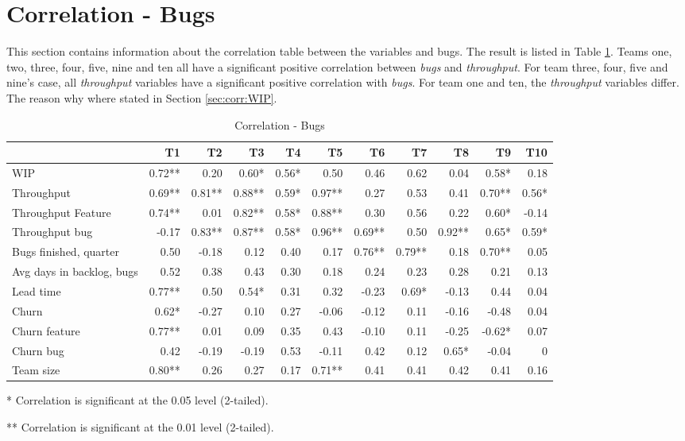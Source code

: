 \documentclass[UKenglish]{ifimaster}  %
\begin{document}
\section{Correlation - Bugs}
\label{sec:corr:bug}
This section contains information about the correlation table between the variables and bugs. The result is listed in Table \ref{corr:bug}. Teams one, two, three, four, five, nine and ten all have a significant positive correlation between \textit{bugs} and \textit{throughput}. For team three, four, five and nine's case, all \textit{throughput} variables have a significant positive correlation with \textit{bugs}. For team one and ten, the \textit{throughput} variables differ. The reason why where stated in Section \ref{sec:corr:WIP}. 
\begin{table}[!htbp]
 \begin{adjustwidth}{-2.5cm}{}
 \centering
 \begin{tabular}{|l|r|r|r|r|r|r|r|r|r|r|}
\hline
 &  \bf{T1} & \bf{T2} & \bf{T3} & \bf{T4} & \bf{T5} & \bf{T6} & \bf{T7} & \bf{T8} & \bf{T9} & \bf{T10}\\ \hline
 WIP  & 0.72** & 0.20 & 0.60* & 0.56* & 0.50 & 0.46 & 0.62 & 0.04 & 0.58* & 0.18 \\ \hline
 Throughput  & 0.69** & 0.81** & 0.88** & 0.59* & 0.97** & 0.27 & 0.53 & 0.41 & 0.70** & 0.56* \\ \hline
 Throughput Feature  & 0.74** & 0.01 & 0.82** & 0.58* & 0.88** & 0.30 & 0.56 & 0.22 & 0.60* & -0.14 \\ \hline
 Throughput bug  & -0.17 & 0.83** & 0.87** & 0.58* & 0.96** & 0.69** & 0.50 & 0.92** & 0.65* & 0.59* \\ \hline
 Bugs finished, quarter  & 0.50 & -0.18 & 0.12 & 0.40 & 0.17 & 0.76** & 0.79** & 0.18 & 0.70** & 0.05 \\ \hline
 Avg days in backlog, bugs  & 0.52 & 0.38 & 0.43 & 0.30 & 0.18 & 0.24 & 0.23 & 0.28 & 0.21 & 0.13 \\ \hline
 Lead time  & 0.77** & 0.50 & 0.54* & 0.31 & 0.32 & -0.23 & 0.69* & -0.13 & 0.44 & 0.04 \\ \hline
 Churn  & 0.62* & -0.27 & 0.10 & 0.27 & -0.06 & -0.12 & 0.11 & -0.16 & -0.48 & 0.04 \\ \hline
 Churn feature  & 0.77** & 0.01 & 0.09 & 0.35 & 0.43 & -0.10 & 0.11 & -0.25 & -0.62* & 0.07 \\ \hline
 Churn bug  & 0.42 & -0.19 & -0.19 & 0.53 & -0.11 & 0.42 & 0.12 & 0.65* & -0.04 & 0\\ \hline
 Team size  & 0.80** & 0.26 & 0.27 & 0.17 & 0.71** & 0.41 & 0.41 & 0.42 & 0.41 & 0.16 \\ \hline
\end{tabular}
 \caption{Correlation - Bugs}
 \label{corr:bug}
 \centerline {* Correlation is significant at the 0.05 level (2-tailed).}
\centerline{** Correlation is significant at the 0.01 level (2-tailed).}
\end{adjustwidth}
\end{table}
\end{document}
